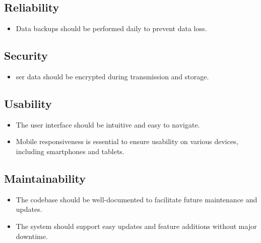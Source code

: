 \subsection{Reliability}
\begin{itemize}
        \item Data backups should be performed daily to prevent data loss.
\end{itemize}

\subsection{Security}
\begin{itemize}
        \item ser data should be encrypted during transmission and storage.
\end{itemize}

\subsection{Usability}
\begin{itemize}
        \item The user interface should be intuitive and easy to navigate.
        \item Mobile responsiveness is essential to ensure usability on various devices, including smartphones and tablets.
\end{itemize}

\subsection{Maintainability}
\begin{itemize}
        \item The codebase should be well-documented to facilitate future maintenance and updates.
        \item The system should support easy updates and feature additions without major downtime.
\end{itemize}

